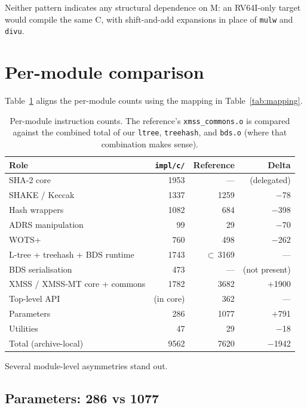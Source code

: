 \documentclass[11pt,a4paper]{article}
\begin{document}
Neither pattern indicates any structural dependence on M: an
RV64I-only target would compile the same C, with shift-and-add
expansions in place of \texttt{mulw} and \texttt{divu}.

\section{Per-module comparison}

Table~\ref{tab:per-module-cmp} aligns the per-module counts using
the mapping in Table~\ref{tab:mapping}.

\begin{table}[ht]
\centering
\caption{Per-module instruction counts.  The reference's
  \texttt{xmss\_commons.o} is compared against the combined total of
  our \texttt{ltree}, \texttt{treehash}, and \texttt{bds.o} (where
  that combination makes sense).}
\label{tab:per-module-cmp}
\begin{tabular}{@{}lrrr@{}}
\toprule
Role & \texttt{impl/c/} & Reference & Delta \\
\midrule
SHA-2 core                   & 1953 & ---  & (delegated) \\
SHAKE / Keccak               & 1337 & 1259 & $-$78 \\
Hash wrappers                & 1082 &  684 & $-$398 \\
ADRS manipulation            &   99 &   29 & $-$70 \\
WOTS+                        &  760 &  498 & $-$262 \\
L-tree + treehash + BDS runtime & 1743 & $\subset$\,3169 & --- \\
BDS serialisation            &  473 &  --- & (not present) \\
XMSS / XMSS-MT core + commons & 1782 & 3682 & $+$1900 \\
Top-level API                & (in core) & 362 & --- \\
Parameters                   &  286 & 1077 & $+$791 \\
Utilities                    &   47 &   29 & $-$18 \\
\midrule
Total (archive-local)        & 9562 & 7620 & $-$1942 \\
\bottomrule
\end{tabular}
\end{table}

Several module-level asymmetries stand out.

\subsection{Parameters: 286 vs 1077}
\end{document}
